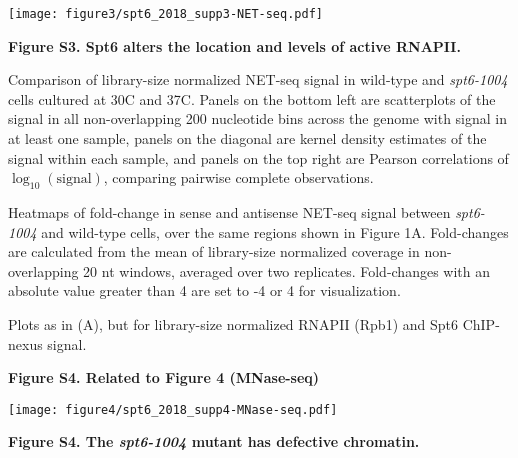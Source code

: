 \documentclass[9pt, letterpaper]{extarticle}
\begin{document}
{\centering \texttt{[image: figure3/spt6\_2018\_supp3-NET-seq.pdf]}\par}

\textbf{Figure S3. Spt6 alters the location and levels of active RNAPII.}

\begin{description}[noitemsep, topsep=0pt, align=right, labelwidth=12pt, itemindent=0pt, leftmargin=0pt]
	\item [\textbf{(A)}] Comparison of library-size normalized NET-seq signal in wild-type and \textit{spt6-1004} cells cultured at 30{\textdegree}C and 37{\textdegree}C. Panels on the bottom left are scatterplots of the signal in all non-overlapping 200 nucleotide bins across the genome with signal in at least one sample, panels on the diagonal are kernel density estimates of the signal within each sample, and panels on the top right are Pearson correlations of $\log_{10}\left(\text{signal} \right)$, comparing pairwise complete observations.
	\item [\textbf{(B)}] Heatmaps of fold-change in sense and antisense NET-seq signal between \textit{spt6-1004} and wild-type cells, over the same regions shown in Figure 1A. Fold-changes are calculated from the mean of library-size normalized coverage in non-overlapping 20 nt windows, averaged over two replicates. Fold-changes with an absolute value greater than 4 are set to -4 or 4 for visualization.
	\item [\textbf{(C)}] Plots as in (A), but for library-size normalized RNAPII (Rpb1) and Spt6 ChIP-nexus signal.
\end{description}

\newpage

\textbf{\large Figure S4. Related to Figure 4 (MNase-seq)}

{\centering \texttt{[image: figure4/spt6\_2018\_supp4-MNase-seq.pdf]}\par}

\textbf{Figure S4. The \textit{spt6-1004} mutant has defective chromatin.}
\end{document}

